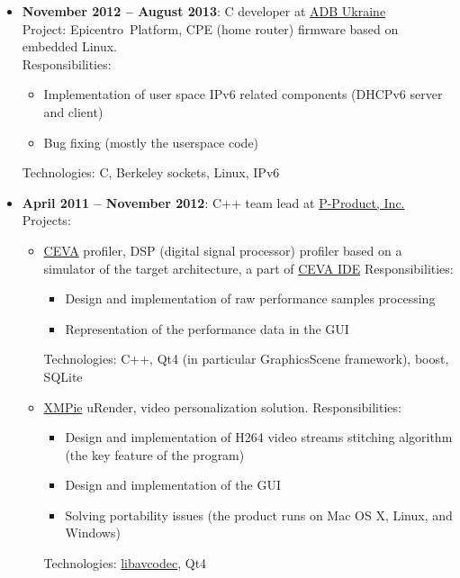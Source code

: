 \documentclass{report}
\begin{document}
\begin{itemize}
\item
  {\bf November 2012 -- August 2013}: C developer at
  \href{http://www.adbglobal.com}{ADB Ukraine} \\
  Project:
  {Epicentro~Platform}, CPE (home router) firmware based on embedded Linux. \\
  Responsibilities:
  \begin{itemize}
     \item Implementation of user space IPv6 related components (DHCPv6 server and client)
     \item Bug fixing (mostly the userspace code)
   \end{itemize}
  Technologies: C, Berkeley sockets, Linux, IPv6

\item {\bf April 2011 -- November 2012}: C++ team lead at
  \href{http://p-product.com}{P-Product, Inc.}
  Projects:
  \begin{itemize}
  \item
    \href{http://www.ceva-dsp.com}{CEVA} profiler,
    DSP (digital signal processor) profiler based on a simulator of
    the target architecture, a part of
    \href{http://www.ceva-dsp.com/products/tools/software/index.php}{CEVA IDE}
    Responsibilities:
    \begin{itemize}
      \item Design and implementation of raw performance samples processing
      \item Representation of the performance data in the GUI
    \end{itemize}
    Technologies: C++, Qt4 (in particular GraphicsScene framework), boost, SQLite

  \item
    \href{http://www.xmpie.com}{XMPie} uRender, video personalization solution.
    Responsibilities:
    \begin{itemize}
      \item Design and implementation of H264 video streams stitching algorithm
            (the key feature of the program)
      \item Design and implementation of the GUI
      \item Solving portability issues (the product runs on Mac OS X, Linux, and Windows)
    \end{itemize}
    Technologies: \href{http://ffmpeg.org}{libavcodec}, Qt4
  \end{itemize}


\end{itemize}
\end{document}
